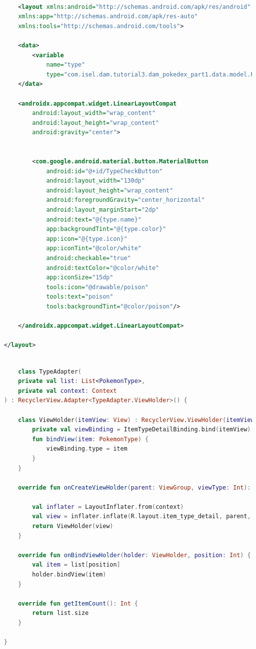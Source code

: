 \documentclass[a4paper, 12pt]{article}
\begin{document}
\begin{lstlisting}[caption={Pokemon Type Item Layout.}, label={layout:pk_type}, language=XML]

    <layout xmlns:android="http://schemas.android.com/apk/res/android"
    xmlns:app="http://schemas.android.com/apk/res-auto"
    xmlns:tools="http://schemas.android.com/tools">

    <data>
        <variable
            name="type"
            type="com.isel.dam.tutorial3.dam_pokedex_part1.data.model.PokemonType" />
    </data>

    <androidx.appcompat.widget.LinearLayoutCompat
        android:layout_width="wrap_content"
        android:layout_height="wrap_content"
        android:gravity="center">


        <com.google.android.material.button.MaterialButton
            android:id="@+id/TypeCheckButton"
            android:layout_width="130dp"
            android:layout_height="wrap_content"
            android:foregroundGravity="center_horizontal"
            android:layout_marginStart="2dp"
            android:text="@{type.name}"
            app:backgroundTint="@{type.color}"
            app:icon="@{type.icon}"
            app:iconTint="@color/white"
            android:checkable="true"
            android:textColor="@color/white"
            app:iconSize="15dp"
            tools:icon="@drawable/poison"
            tools:text="poison"
            tools:backgroundTint="@color/poison"/>

    </androidx.appcompat.widget.LinearLayoutCompat>

</layout>


\end{lstlisting}  

\begin{lstlisting}[caption={Pokemon Type Adapter code.}, label={code:pk_type_adapter}, language=Kotlin]

    class TypeAdapter(
    private val list: List<PokemonType>,
    private val context: Context
) : RecyclerView.Adapter<TypeAdapter.ViewHolder>() {

    class ViewHolder(itemView: View) : RecyclerView.ViewHolder(itemView) {
        private val viewBinding = ItemTypeDetailBinding.bind(itemView)
        fun bindView(item: PokemonType) {
            viewBinding.type = item
        }
    }

    override fun onCreateViewHolder(parent: ViewGroup, viewType: Int): ViewHolder {

        val inflater = LayoutInflater.from(context)
        val view = inflater.inflate(R.layout.item_type_detail, parent, false)
        return ViewHolder(view)
    }

    override fun onBindViewHolder(holder: ViewHolder, position: Int) {
        val item = list[position]
        holder.bindView(item)
    }

    override fun getItemCount(): Int {
        return list.size
    }

}


\end{lstlisting}  
\end{document}
